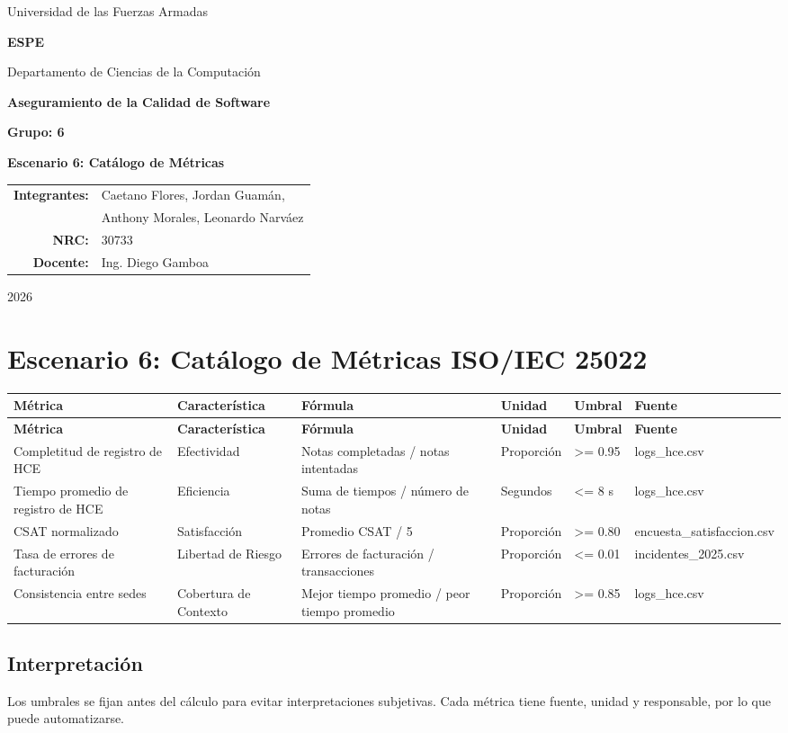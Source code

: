 \documentclass[11pt]{article}
\begin{document}
\begin{titlepage}
\centering
{\Large Universidad de las Fuerzas Armadas\par}
{\LARGE \textbf{ESPE}\par}
\vspace{0.35cm}
{\large Departamento de Ciencias de la Computación\par}
\vspace{1.5cm}
{\Large \textbf{Aseguramiento de la Calidad de Software}\par}
\vspace{0.5cm}
{\large \textbf{Grupo: 6}\par}
\vspace{1.2cm}
{\Large \textbf{Escenario 6: Catálogo de Métricas}\par}
\vfill
\begin{tabular}{rl}
\textbf{Integrantes:} & Caetano Flores, Jordan Guamán,\\
& Anthony Morales, Leonardo Narváez\\
\textbf{NRC:} & 30733\\
\textbf{Docente:} & Ing. Diego Gamboa\\
\end{tabular}
\vfill
{\large 2026\par}
\end{titlepage}

\section*{Escenario 6: Catálogo de Métricas ISO/IEC 25022}

\small
\begin{longtable}{p{} p{} p{} p{} p{} p{}}
\toprule
\textbf{Métrica} & \textbf{Característica} & \textbf{Fórmula} & \textbf{Unidad} & \textbf{Umbral} & \textbf{Fuente} \\
\midrule
\endfirsthead
\toprule
\textbf{Métrica} & \textbf{Característica} & \textbf{Fórmula} & \textbf{Unidad} & \textbf{Umbral} & \textbf{Fuente} \\
\midrule
\endhead
Completitud de registro de HCE & Efectividad & Notas completadas / notas intentadas & Proporción & >= 0.95 & logs\_hce.csv \\
Tiempo promedio de registro de HCE & Eficiencia & Suma de tiempos / número de notas & Segundos & <= 8 s & logs\_hce.csv \\
CSAT normalizado & Satisfacción & Promedio CSAT / 5 & Proporción & >= 0.80 & encuesta\_satisfaccion.csv \\
Tasa de errores de facturación & Libertad de Riesgo & Errores de facturación / transacciones & Proporción & <= 0.01 & incidentes\_2025.csv \\
Consistencia entre sedes & Cobertura de Contexto & Mejor tiempo promedio / peor tiempo promedio & Proporción & >= 0.85 & logs\_hce.csv \\
\bottomrule
\end{longtable}
\normalsize

\subsection*{Interpretación}
Los umbrales se fijan antes del cálculo para evitar interpretaciones subjetivas. Cada métrica tiene fuente, unidad y responsable, por lo que puede automatizarse.
\end{document}
